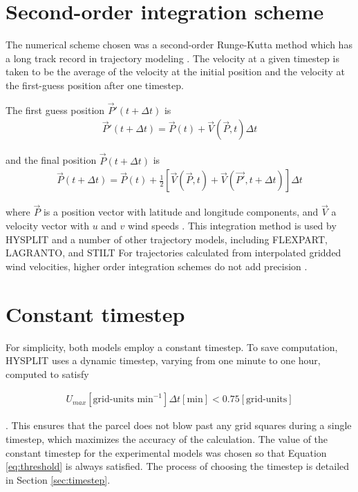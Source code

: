 \section{Second-order integration scheme}
The numerical scheme chosen was a second-order Runge-Kutta method which has a long track record in trajectory modeling \cite{petterssen_weather_1940}.
The velocity at a given timestep is taken to be the average of the velocity at the initial position and the velocity at the first-guess position after one timestep.

The first guess position $\vec{P}' (t + \Delta t)$ is 
\begin{align}
    \vec{P}' (t + \Delta t) = \vec{P}(t) + \vec{V} (\vec{P}, t) \Delta t
\end{align}

and the final position $\vec{P} (t + \Delta t)$ is
\begin{align}
    \vec{P} (t + \Delta t) = \vec{P} (t) + \frac{1}{2} \left [ \vec{V} (\vec{P}, t) + \vec{V} (\vec{P'}, t + \Delta t) \right ] \Delta t
\end{align}

where $\vec{P}$ is a position vector with latitude and longitude components, and $\vec{V}$ a velocity vector with $u$ and $v$ wind speeds \cite{draxler_description_1997}.
This integration method is used by HYSPLIT and a number of other trajectory models, including FLEXPART, LAGRANTO, and STILT \cite{bowman_input_2013, stein_noaas_2015} 
For trajectories calculated from interpolated gridded wind velocities, higher order integration schemes do not add precision \cite{draxler_description_1997}.  

\section{Constant timestep}
For simplicity, both models employ a constant timestep.
To save computation, HYSPLIT uses a dynamic timestep, varying from one minute to one hour, computed to satisfy

\begin{align}
    U_{max} [\text{grid-units min}^{-1}] \Delta t [\text{min}] < 0.75 [\text{grid-units}] \label{eq:threshold}
\end{align}

\cite{draxler_description_1997}. This ensures that the parcel does not blow past any grid squares during a single timestep, which maximizes the accuracy of the calculation. 
The value of the constant timestep for the experimental models was chosen so that Equation \ref{eq:threshold} is always satisfied.
The process of choosing the timestep is detailed in Section \ref{sec:timestep}. 

